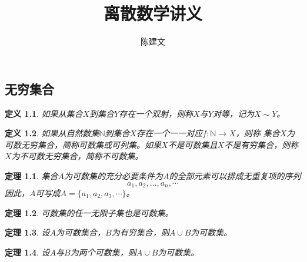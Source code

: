 \documentclass{book}[oneside]
\newtheorem{Def}{定义}[chapter]
\newtheorem{Thm}{定理}[chapter]
\begin{document}
\begin{CJK*}{UTF8}{gbsn}
  \title{离散数学讲义}
  \author{陈建文}
  \maketitle
  

  \setcounter{chapter}{3}
  \chapter{无穷集合}
  \begin{Def}
    如果从集合$X$到集合$Y$存在一个双射，则称$X$与$Y$对等，记为$X \sim Y$。
  \end{Def}
  \begin{Def}
    如果从自然数集$\mathbb{N}$到集合$X$存在一个一一对应$f:\mathbb{N}\to X$，则称
    集合$X$为可数无穷集合，简称可数集或可列集。如果$X$不是可数集且$X$不是有穷集合，则称$X$为不可数无穷集合，简称不可数集。
  \end{Def}
  \begin{Thm}
    集合$A$为可数集的充分必要条件为$A$的全部元素可以排成无重复项的序列
    \[a_1, a_2, \ldots, a_n, \cdots\]
    因此，$A$可写成$A = \{a_1, a_2, a_3, \cdots\}$。
  \end{Thm}
    \begin{Thm}
       可数集的任一无限子集也是可数集。
  \end{Thm}
  \begin{Thm}
   设$A$为可数集合，$B$为有穷集合，则$A\cup B$为可数集。
  \end{Thm}
  \begin{Thm}
    设$A$与$B$为两个可数集，则$A\cup B$为可数集。
  \end{Thm}


\end{CJK*}
\end{document}
